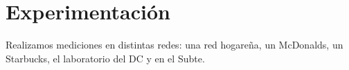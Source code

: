 \section{Experimentación}
Realizamos mediciones en distintas redes: una red hogareña, un McDonalds, un Starbucks, el laboratorio del DC y en el Subte.
\newpage


\newpage


\newpage


\newpage


\newpage


\newpage


